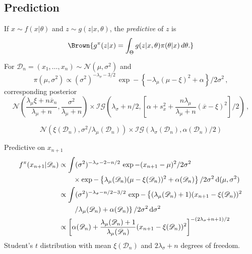 \subsection{Prediction}
\begin{slide}

If $x \sim f(x|\theta)$ and $z\sim g(z|x,\theta)$, 
the {\it predictive} of $z$ is
\[{\Brown{
 g^\pi(z|x) = \int_{\Theta} g(z|x,\theta)\pi(\theta|x)\,d\theta.
}}\]

\end{slide}\begin{slide}

For $\mathscr{D}_n=(x_1,\ldots,x_n)\sim\mathscr{N} (\mu,\sigma^2)$ and
$$
\pi(\mu,\sigma^2) \propto (\sigma^2)^{-\lambda_\sigma-3/2}\,
	\exp-\left\{ -\lambda_\mu(\mu-\xi)^2 + \alpha\right\}/2\sigma^2\,,
$$
corresponding posterior 
\footnotesize
$$
\mathscr{N}\left(\frac{\lambda_\mu\xi+n\overline x_n}{\lambda_\mu+n},
\frac{\sigma^2}{\lambda_\mu+n}\right) \times \mathscr{IG} \left(
\lambda_\sigma+n/2,\left[
\alpha+s^2_x+\frac{n\lambda_\mu}{\lambda_\mu+n}(\overline x - \xi)^2\right]/2 \right)\,,
$$
\normalsize

\pause {}
$$
\mathscr{N}\left(\xi(\mathscr{D}_n),\sigma^2/\lambda_\mu(\mathscr{D}_n)
\right) \times \mathscr{IG} \left(
\lambda_\sigma(\mathscr{D}_n),\alpha(\mathscr{D}_n)/2 \right)
$$

\end{slide}\begin{slide}

Predictive on $x_{n+1}$
\small 
\begin{align*}
f^\pi(x_{n+1}|\mathscr{D}_n) &\propto \int (\sigma^2)^{-\lambda_\sigma-2-n/2}\,
\exp-(x_{n+1}-\mu)^2/2\sigma^2 \\
&\qquad \times \exp-\left\{ \lambda_\mu(\mathscr{D}_n)(\mu-\xi(\mathscr{D}_n))^2
+ \alpha(\mathscr{D}_n) \right\}/2\sigma^2\,\hbox{d}(\mu,\sigma^2)\\
&\propto \int (\sigma^2)^{-\lambda_\sigma-n/2-3/2}\,
\exp-\left\{ (\lambda_\mu(\mathscr{D}_n)+1)(x_{n+1}-\xi(\mathscr{D}_n))^2\right.\\
&\qquad\left.
/\lambda_\mu(\mathscr{D}_n) +\alpha(\mathscr{D}_n) \right\}/2\sigma^2\,\hbox{d}\sigma^2\\
&\propto \left[ \alpha(\mathscr{D}_n) + \frac{\lambda_\mu(\mathscr{D}_n)+1}{
\lambda_\mu(\mathscr{D}_n)} (x_{n+1}-\xi(\mathscr{D}_n))^2 \right]^{-(2\lambda_\sigma+n+1)/2}
\end{align*}
\normalsize
Student's $t$ distribution with mean $\xi(\mathscr{D}_n)$ 
and $2\lambda_\sigma+n$ degrees of freedom.



\end{slide}
